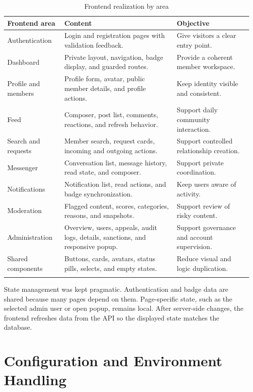 \begin{longtable}{|m{3.5cm}|m{5.4cm}|m{5.2cm}|}
\hline
\textbf{Frontend area} & \textbf{Content} & \textbf{Objective} \\
\hline
Authentication & Login and registration pages with validation feedback. & Give visitors a clear entry point. \\
\hline
Dashboard & Private layout, navigation, badge display, and guarded routes. & Provide a coherent member workspace. \\
\hline
Profile and members & Profile form, avatar, public member details, and profile actions. & Keep identity visible and consistent. \\
\hline
Feed & Composer, post list, comments, reactions, and refresh behavior. & Support daily community interaction. \\
\hline
Search and requests & Member search, request cards, incoming and outgoing actions. & Support controlled relationship creation. \\
\hline
Messenger & Conversation list, message history, read state, and composer. & Support private coordination. \\
\hline
Notifications & Notification list, read actions, and badge synchronization. & Keep users aware of activity. \\
\hline
Moderation & Flagged content, scores, categories, reasons, and snapshots. & Support review of risky content. \\
\hline
Administration & Overview, users, appeals, audit logs, details, sanctions, and responsive popup. & Support governance and account supervision. \\
\hline
Shared components & Buttons, cards, avatars, status pills, selects, and empty states. & Reduce visual and logic duplication. \\
\hline
\caption{Frontend realization by area}
\end{longtable}

State management was kept pragmatic. Authentication and badge data are shared because many pages depend on them. Page-specific state, such as the selected admin user or open popup, remains local. After server-side changes, the frontend refreshes data from the API so the displayed state matches the database.

\section{Configuration and Environment Handling}

